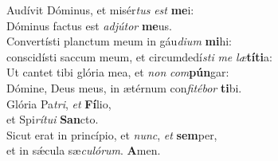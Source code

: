 \oddverse Audívit Dóminus, et misér\textit{tus} \textit{est} \textbf{me}i:~\*\\
\oddverse Dóminus factus est \textit{ad}\textit{jú}\textit{tor} \textbf{me}us.\\
\evenverse Convertísti planctum meum in gáu\textit{di}\textit{um} \textbf{mi}hi:~\*\\
\evenverse conscidísti saccum meum, et circumdedí\textit{sti} \textit{me} \textit{læ}\textbf{tí}\textbf{ti}a:\\
\oddverse Ut cantet tibi glória mea, et \textit{non} \textit{com}\textbf{pún}gar:~\*\\
\oddverse Dómine, Deus meus, in ætérnum con\textit{fi}\textit{té}\textit{bor} \textbf{ti}bi.\\
\evenverse Glória Pa\textit{tri}, \textit{et} \textbf{Fí}lio,~\*\\
\evenverse et Spi\textit{rí}\textit{tu}\textit{i} \textbf{San}cto.\\
\oddverse Sicut erat in princípio, et \textit{nunc}, \textit{et} \textbf{sem}per,~\*\\
\oddverse et in sǽcula sæ\textit{cu}\textit{ló}\textit{rum}. \textbf{A}men.\\
